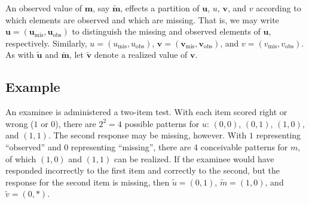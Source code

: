 \documentclass[
    a4paper,                %
    11pt,                   %
    jou,                    %
    biblatex                %
    colorlinks=true,        %
    linkcolor=red,          %
    anchorcolor=black,      %
    citecolor=blue,         %
    urlcolor=blue,          %
    bookmarks=true,         %
    bookmarksopen=false,    %
    bookmarksnumbered=true  %
]{apa7}
\newcommand{\m}[1]{\boldsymbol{#1}}
\renewcommand{\hat}[1]{\widehat{#1}}
\renewcommand{\tilde}[1]{\widetilde{#1}}
\begin{document}
An observed value of $\m{m}$, say $\tilde{\m{m}}$, effects a partition of $\m{u}$, $u$, $\m{v}$, and $v$ according to which elements are observed and which are missing. That is, we may write $\m{u} = \left( \m{u}_\text{mis}, \m{u}_\text{obs} \right)$ to distinguish the missing and observed elements of $\m{u}$, respectively. Similarly, $u = \left( u_\text{mis}, u_\text{obs} \right)$, $\m{v} = \left( \m{v}_\text{mis}, \m{v}_\text{obs} \right)$, and $v = \left( v_\text{mis}, v_\text{obs} \right)$. As with $\tilde{\m{u}}$ and $\tilde{\m{m}}$, let $\tilde{\m{v}}$ denote a realized value of $\m{v}$.

\subsection{Example}

An examinee is administered a two-item test. With each item scored right or wrong ($1$ or $0$), there are $2^2 = 4$ possible patterns for $u$: $(0,0)$, $(0,1)$, $(1,0)$, and $(1,1)$. The second response may be missing, however. With $1$ representing ``ob\renewcommand{\hat}[1]{\widehat{#1}}served'' and $0$ representing ``missing'', there are 4 conceivable patterns for $m$, of which $(1,0)$ and $(1,1)$ can be realized. If the examinee would have responded incorrectly to the first item and correctly to the second, but the response for the second item is missing, then $\tilde{u} = (0,1)$, $\tilde{m}=(1,0)$, and $\tilde{v}=(0,*)$.
\end{document}

